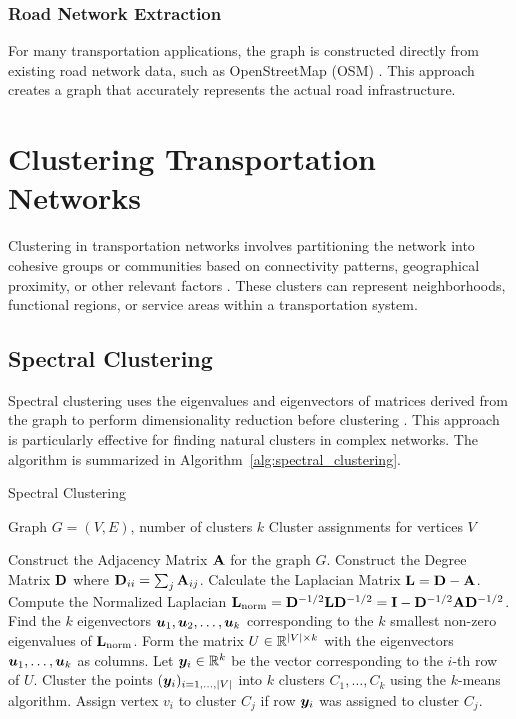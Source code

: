 \subsubsection{Road Network Extraction}
For many transportation applications, the graph is constructed directly from existing road network data, such as OpenStreetMap (OSM) . This approach creates a graph that accurately represents the actual road infrastructure.

\section{Clustering Transportation Networks}
\label{se:ClusteringMethods}

Clustering in transportation networks involves partitioning the network into cohesive groups or communities based on connectivity patterns, geographical proximity, or other relevant factors . These clusters can represent neighborhoods, functional regions, or service areas within a transportation system.

\subsection{Spectral Clustering}
\label{subsec:SpectralClustering}

Spectral clustering uses the eigenvalues and eigenvectors of matrices derived from the graph to perform dimensionality reduction before clustering . This approach is particularly effective for finding natural clusters in complex networks. The algorithm is summarized in Algorithm~\ref{alg:spectral_clustering}.

\begin{algorithm}[H]
\caption{Spectral Clustering}
\label{alg:spectral_clustering}
\begin{algorithmic}[1]
\Require Graph $G = (V, E)$, number of clusters $k$
\Ensure Cluster assignments for vertices $V$

\State Construct the Adjacency Matrix $\mathbf{A}$ for the graph $G$.
\State Construct the Degree Matrix $\mathbf{D}$ where $\mathbf{D}_{ii} = \sum_j \mathbf{A}_{ij}$.
\State Calculate the Laplacian Matrix $\mathbf{L} = \mathbf{D} - \mathbf{A}$.
\State Compute the Normalized Laplacian $\mathbf{L}_{\text{norm}} = \mathbf{D}^{-1/2} \mathbf{L} \mathbf{D}^{-1/2} = \mathbf{I} - \mathbf{D}^{-1/2} \mathbf{A} \mathbf{D}^{-1/2}$.
\State Find the $k$ eigenvectors $\boldsymbol{u}_1, \boldsymbol{u}_2, \dots, \boldsymbol{u}_k$ corresponding to the $k$ smallest non-zero eigenvalues of $\mathbf{L}_{\text{norm}}$.
\State Form the matrix $U \in \mathbb{R}^{|V| \times k}$ with the eigenvectors $\boldsymbol{u}_1, \dots, \boldsymbol{u}_k$ as columns.
\State Let $\boldsymbol{y}_i \in \mathbb{R}^k$ be the vector corresponding to the $i$-th row of $U$.
\State Cluster the points $(\boldsymbol{y}_i)_{i=1, \dots, |V|}$ into $k$ clusters $C_1, \dots, C_k$ using the $k$-means algorithm.
\State Assign vertex $v_i$ to cluster $C_j$ if row $\boldsymbol{y}_i$ was assigned to cluster $C_j$.

\end{algorithmic}
\end{algorithm}

